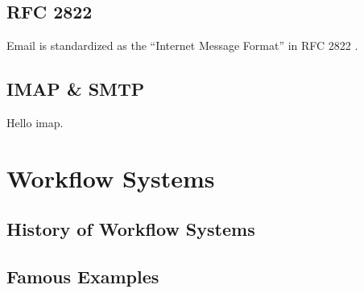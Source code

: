 \subsection{RFC 2822}

Email is standardized as the ``Internet Message Format'' in RFC 2822 \citep{email}.

\subsection{IMAP \& SMTP}

Hello \gls{imap}.


\section{Workflow Systems}


\subsection{History of Workflow Systems}


\subsection{Famous Examples}